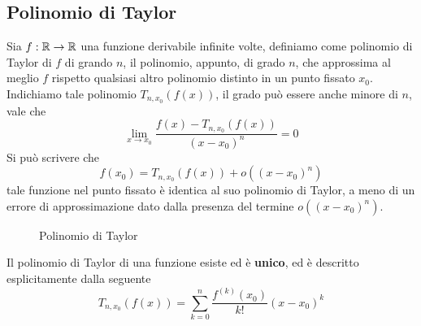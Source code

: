 \documentclass[10pt, letterpaper]{report}
\begin{document}
\subsection{Polinomio di Taylor}
Sia $f:{\mathbb R}\rightarrow {\mathbb R}$ una funzione derivabile infinite volte, definiamo come 
polinomio di Taylor di $f$ di grando $n$, il polinomio, appunto, di grado $n$, che approssima 
al meglio $f$ rispetto qualsiasi altro polinomio distinto in un punto fissato $x_0$.\acc 
Indichiamo tale polinomio $T_{n,x_0}(f(x))$, il grado può essere anche minore di $n$, 
vale che $$ 
\lim_{x\rightarrow x_0}\dfrac{f(x)-T_{n,x_0}(f(x))}{(x-x_0)^n}=0
$$
Si può scrivere che $$f(x_0)=T_{n,x_0}(f(x))+o((x-x_0)^n)$$ tale funzione nel punto 
fissato è identica al suo polinomio di Taylor, a meno di un errore di approssimazione dato 
dalla presenza del termine $o((x-x_0)^n)$.
\begin{figure}[h!]
    \centering
    \label{fig:cos}
    \caption{Polinomio di Taylor}
\end{figure}\acc
Il polinomio di Taylor di una funzione esiste ed è \textbf{unico}, ed è descritto esplicitamente 
dalla seguente $$ 
T_{n,x_0}(f(x))=\sum_{k=0}^n\dfrac{f^{(k)}(x_0)}{k!}(x-x_0)^k
$$
\end{document}
